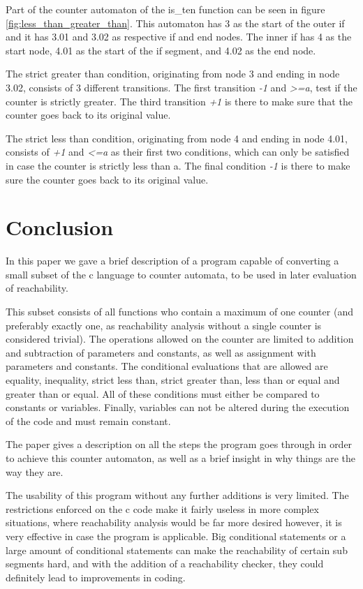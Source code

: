 \documentclass[12pt]{article}
\begin{document}
Part of the counter automaton of the is\_ten function can be seen in figure \ref{fig:less_than_greater_than}. This automaton has 3 as the start of the outer if and it has 3.01 and 3.02 as respective if and end nodes. The inner if has 4 as the start node, 4.01 as the start of the if segment, and 4.02 as the end node.

The strict greater than condition, originating from node 3 and ending in node 3.02, consists of 3 different transitions. The first transition \textit{-1} and \textit{\textgreater =a}, test if the counter is strictly greater. The third transition \textit{+1} is there to make sure that the counter goes back to its original value.

The strict less than condition, originating from node 4 and ending in node 4.01, consists of \textit{+1} and \textit{\textless =a} as their first two conditions, which can only be satisfied in case the counter is strictly less than a. The final condition \textit{-1} is there to make sure the counter goes back to its original value.


\section{Conclusion}
In this paper we gave a brief description of a program capable of converting a small subset of the c language to counter automata, to be used in later evaluation of reachability. 

This subset consists of all functions who contain a maximum of one counter (and preferably exactly one, as reachability analysis without a single counter is considered trivial). The operations allowed on the counter are limited to addition and subtraction of parameters and constants, as well as assignment with parameters and constants. The conditional evaluations that are allowed are equality, inequality, strict less than, strict greater than, less than or equal and greater than or equal. All of these conditions must either be compared to constants or variables. Finally, variables can not be altered during the execution of the code and must remain constant.

The paper gives a description on all the steps the program goes through in order to achieve this counter automaton, as well as a brief insight in why things are the way they are.

The usability of this program without any further additions is very limited. The restrictions enforced on the c code make it fairly useless in more complex situations, where reachability analysis would be far more desired however, it is very effective in case the program is applicable. Big conditional statements or a large amount of conditional statements can make the reachability of certain sub segments hard, and with the addition of a reachability checker, they could definitely lead to improvements in coding.
\end{document}
